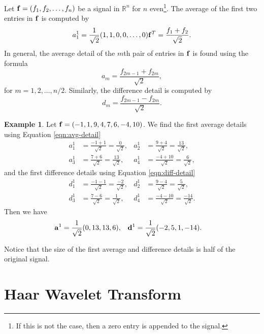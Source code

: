 \documentclass{article}
\def\RR{\mathbb{R}}
\theoremstyle{definition}
\newtheorem{example}[definition]{Example}
\begin{document}
  Let \(\vb{f} = (f_1, f_2, \dots, f_n)\) be a signal in \(\RR^{n}\) for \(n\) even\footnote{If this is not the case, then a zero entry is appended to the signal.}. The average of the first two entries in \(\vb{f}\) is computed by
  \[a_1^1 = \frac{1}{\sqrt{2}} (1,1,0,0,\dots,0) \vb{f}^T = \frac{f_1 + f_2}{\sqrt{2}}.\]
  In general, the average detail of the \(m\)th pair of entries in \(\vb{f}\) is found using the formula
  \begin{equation} \label{eqn:avg-detail}
    a_m = \frac{f_{2m-1} + f_{2m}}{\sqrt{2}},
  \end{equation}
  for \(m = 1, 2, \dots, n/2\). Similarly, the difference detail is computed by
  \begin{equation} \label{eqn:diff-detail}
    d_m = \frac{f_{2m-1} - f_{2m}}{\sqrt{2}}.
  \end{equation}

  \begin{example} \label{eg:decomp-1}
      Let \(\vb{f} = (-1, 1, 9, 4, 7, 6, -4, 10)\). We find the first average details using Equation \eqref{eqn:avg-detail}
      \begin{align*}
      a_1^1 &= \frac{-1+1}{\sqrt{2}} = \frac{0}{\sqrt{2}}, &
      a_2^1 &= \frac{9+4}{\sqrt{2}} = \frac{13}{\sqrt{2}},\\
      a_3^1 &= \frac{7+6}{\sqrt{2}} = \frac{13}{\sqrt{2}}, &
      a_4^1 &= \frac{-4+10}{\sqrt{2}} = \frac{6}{\sqrt{2}},
    \end{align*}
    and the first difference details using Equation \eqref{eqn:diff-detail}
    \begin{align*}
      d_1^1 &= \frac{-1-1}{\sqrt{2}} = \frac{-2}{\sqrt{2}}, &
      d_2^1 &= \frac{9-4}{\sqrt{2}} = \frac{5}{\sqrt{2}},\\
      d_3^1 &= \frac{7-6}{\sqrt{2}} = \frac{1}{\sqrt{2}}, &
      d_4^1 &= \frac{-4-10}{\sqrt{2}} = \frac{-14}{\sqrt{2}}.
    \end{align*}
    Then we have
    \begin{align*}
      \vb{a}^1 &= \frac{1}{\sqrt{2}}(0,13,13,6), &
      \vb{d}^1 &= \frac{1}{\sqrt{2}}(-2,5,1,-14).
    \end{align*}
  \end{example}
    
  Notice that the size of the first average and difference details is half of the original signal.

  \section{Haar Wavelet Transform}
\end{document}
